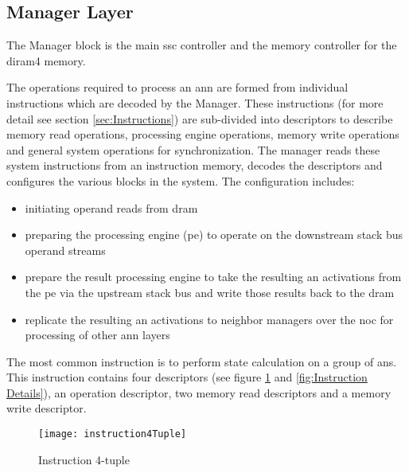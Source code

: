 \iffalse 
Each of the \ac{diram4} memories contain two channels with each channel containing 32 banks and each bank contains 4096 \SI[per-mode=symbol]{4}{\kilo\bit} pages.
\fi

\subsection{Manager Layer}
The Manager block is the main \ac{ssc} controller and the memory controller for the \ac{diram4} memory. 

The operations required to process an \ac{ann} are formed from individual instructions which are decoded by the Manager. 
These instructions (for more detail see section \ref{sec:Instructions}) are sub-divided into descriptors to describe memory read operations, processing engine operations, memory write operations and general system operations for synchronization. 
The manager reads these system instructions from an instruction memory, decodes the descriptors and configures the various blocks in the system.
The configuration includes:
\begin{itemize}
      \item initiating operand reads from \ac{dram}
      \item preparing the processing engine (\ac{pe}) to operate on the downstream stack bus operand streams
      \item prepare the result processing engine to take the resulting \ac{an} activations from the \ac{pe} via the upstream stack bus and write those results back to the \ac{dram}
      \item replicate the resulting \ac{an} activations to neighbor managers over the \ac{noc} for processing of other \ac{ann} layers
\end{itemize}

The most common instruction is to perform state calculation on a group of \acp{an}.
This instruction contains four descriptors (see figure \ref{fig:Instruction 4-tuple} and \ref{fig:Instruction Details}), an operation descriptor, two memory read descriptors and a memory write descriptor.
\begin{figure}[!t]
\centering
\captionsetup{justification=centering}
\captionsetup{width=.9\linewidth}
\centerline{
\mbox{\texttt{[image: instruction4Tuple]}}
}
\caption{Instruction 4-tuple}
\label{fig:Instruction 4-tuple}
\end{figure}


